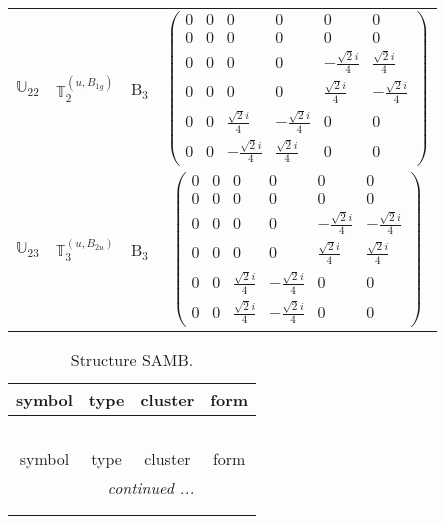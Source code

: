 \documentclass[fleqn,10pt,landscape]{article}
\begin{document}
\begin{itemize}
\begin{center}
\begin{longtable}{c|c|c|c}
$ \mathbb{U}_{22} $ & $\mathbb{T}_{2}^{(u,B_{1g})}$ & B$_{3}$ & $\begin{pmatrix} 0 & 0 & 0 & 0 & 0 & 0 \\ 0 & 0 & 0 & 0 & 0 & 0 \\ 0 & 0 & 0 & 0 & - \frac{\sqrt{2} i}{4} & \frac{\sqrt{2} i}{4} \\ 0 & 0 & 0 & 0 & \frac{\sqrt{2} i}{4} & - \frac{\sqrt{2} i}{4} \\ 0 & 0 & \frac{\sqrt{2} i}{4} & - \frac{\sqrt{2} i}{4} & 0 & 0 \\ 0 & 0 & - \frac{\sqrt{2} i}{4} & \frac{\sqrt{2} i}{4} & 0 & 0 \end{pmatrix}$ \\
$ \mathbb{U}_{23} $ & $\mathbb{T}_{3}^{(u,B_{2u})}$ & B$_{3}$ & $\begin{pmatrix} 0 & 0 & 0 & 0 & 0 & 0 \\ 0 & 0 & 0 & 0 & 0 & 0 \\ 0 & 0 & 0 & 0 & - \frac{\sqrt{2} i}{4} & - \frac{\sqrt{2} i}{4} \\ 0 & 0 & 0 & 0 & \frac{\sqrt{2} i}{4} & \frac{\sqrt{2} i}{4} \\ 0 & 0 & \frac{\sqrt{2} i}{4} & - \frac{\sqrt{2} i}{4} & 0 & 0 \\ 0 & 0 & \frac{\sqrt{2} i}{4} & - \frac{\sqrt{2} i}{4} & 0 & 0 \end{pmatrix}$ \\
\end{longtable}
\end{center}
\begin{center}
\renewcommand{\arraystretch}{1.3}
\begin{longtable}{c|c|c|c}
\caption{Structure SAMB.}
 \\
 \hline \hline
symbol & type & cluster & form \\ \hline \endfirsthead

\multicolumn{3}{l}{\tablename\ \thetable{}} \\
 \hline \hline
symbol & type & cluster & form \\ \hline \endhead

 \hline \hline
\multicolumn{3}{r}{\footnotesize\it continued ...} \\ \endfoot

 \hline \hline
\multicolumn{3}{r}{} \\ \endlastfoot


\end{longtable}
\end{center}
\end{itemize}
\end{document}
